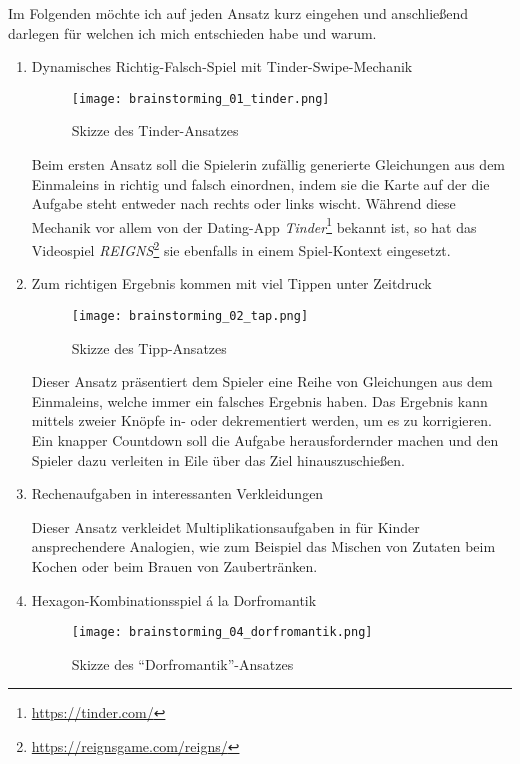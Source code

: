 Im Folgenden möchte ich auf jeden Ansatz kurz eingehen und anschließend darlegen für welchen ich mich entschieden habe und warum.

\begin{enumerate}
  \item Dynamisches Richtig-Falsch-Spiel mit Tinder-Swipe-Mechanik
  
  \begin{figure}[h]
    \centering
    \texttt{[image: brainstorming\_01\_tinder.png]}
    \caption{Skizze des Tinder-Ansatzes}
  \end{figure}

  Beim ersten Ansatz soll die Spielerin zufällig generierte Gleichungen aus dem Einmaleins in richtig und falsch einordnen, indem sie die Karte auf der die Aufgabe steht entweder nach rechts oder links wischt.
  Während diese Mechanik vor allem von der Dating-App \emph{Tinder}\footnote{\url{https://tinder.com/}} bekannt ist, so hat das Videospiel \emph{REIGNS}\footnote{\url{https://reignsgame.com/reigns/}} sie ebenfalls in einem Spiel-Kontext eingesetzt.

  \item Zum richtigen Ergebnis kommen mit viel Tippen unter Zeitdruck
  
  \begin{figure}[h]
    \centering
    \texttt{[image: brainstorming\_02\_tap.png]}
    \caption{Skizze des Tipp-Ansatzes}
  \end{figure}

  Dieser Ansatz präsentiert dem Spieler eine Reihe von Gleichungen aus dem Einmaleins, welche immer ein falsches Ergebnis haben.
  Das Ergebnis kann mittels zweier Knöpfe in- oder dekrementiert werden, um es zu korrigieren.
  Ein knapper Countdown soll die Aufgabe herausfordernder machen und den Spieler dazu verleiten in Eile über das Ziel hinauszuschießen.

  \item Rechenaufgaben in interessanten Verkleidungen
  
  Dieser Ansatz verkleidet Multiplikationsaufgaben in für Kinder ansprechendere Analogien, wie zum Beispiel das Mischen von Zutaten beim Kochen oder beim Brauen von Zaubertränken.

  \item Hexagon-Kombinationsspiel á la Dorfromantik
  
  \begin{figure}[h]
    \centering
    \texttt{[image: brainstorming\_04\_dorfromantik.png]}
    \caption{Skizze des \enquote{Dorfromantik}-Ansatzes}
  \end{figure}


\end{enumerate}
